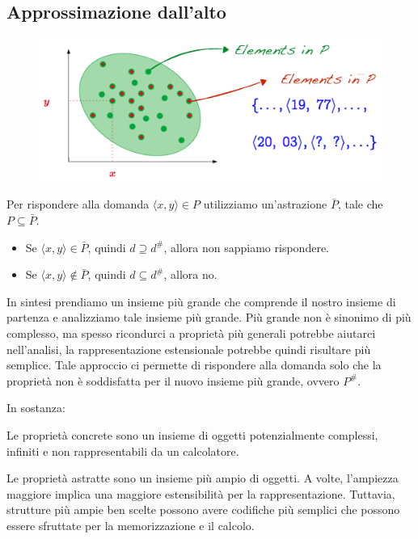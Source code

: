 \subsection{Approssimazione dall'alto}
\begin{figure}[H]
  \centering
  \includegraphics[scale=0.5]{img/approx.png}
\end{figure}
Per rispondere alla domanda $\langle x, y \rangle \in P$ utilizziamo un'astrazione $\bar{P}$,
tale che $P \subseteq \bar{P}$.
\begin{itemize}
  \item Se $\langle x, y \rangle \in \bar{P}$, quindi $d \supseteq d^\#$, allora non sappiamo rispondere.
  \item Se $\langle x, y \rangle \notin \bar{P}$, quindi $d \subseteq d^\#$, allora no.
\end{itemize}
In sintesi prendiamo un insieme più grande che comprende il nostro insieme di partenza e
analizziamo tale insieme più grande. Più grande non è sinonimo di più complesso, ma spesso 
ricondurci a proprietà più generali potrebbe aiutarci nell'analisi, la rappresentazione estensionale 
potrebbe quindi risultare più semplice. Tale approccio ci permette 
di rispondere alla domanda solo che la proprietà non è soddisfatta per il nuovo insieme più grande, 
ovvero $P^\#$.

In sostanza:
\begin{tcolorbox}[title=Proprietà concrete]
Le proprietà concrete sono un insieme di oggetti potenzialmente complessi, infiniti e non rappresentabili
da un calcolatore.
\end{tcolorbox}

\begin{tcolorbox}[title=Proprietà astratte]
  Le proprietà astratte sono un insieme più ampio di oggetti. A volte, l'ampiezza maggiore
  implica una maggiore estensibilità per la rappresentazione. Tuttavia, strutture più ampie
  ben scelte possono
  avere codifiche più semplici che possono essere sfruttate per la memorizzazione e il calcolo.
\end{tcolorbox}
